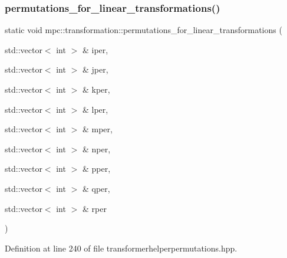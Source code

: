\subsubsection{\texorpdfstring{permutations\+\_\+for\+\_\+linear\+\_\+transformations()}{permutations\_for\_linear\_transformations()}\hspace{0.1cm}{\footnotesize\ttfamily [9/11]}}
{\footnotesize\ttfamily static void mpc\+::transformation\+::permutations\+\_\+for\+\_\+linear\+\_\+transformations (\begin{DoxyParamCaption}\item[{std\+::vector$<$ int $>$ \&}]{iper,  }\item[{std\+::vector$<$ int $>$ \&}]{jper,  }\item[{std\+::vector$<$ int $>$ \&}]{kper,  }\item[{std\+::vector$<$ int $>$ \&}]{lper,  }\item[{std\+::vector$<$ int $>$ \&}]{mper,  }\item[{std\+::vector$<$ int $>$ \&}]{nper,  }\item[{std\+::vector$<$ int $>$ \&}]{pper,  }\item[{std\+::vector$<$ int $>$ \&}]{qper,  }\item[{std\+::vector$<$ int $>$ \&}]{rper }\end{DoxyParamCaption})\hspace{0.3cm}{\ttfamily [static]}}



Definition at line 240 of file transformerhelperpermutations.\+hpp.

\mbox{\label{namespacempc_1_1transformation_afd11ba1dd700163123c9bca5fac99751}} 
